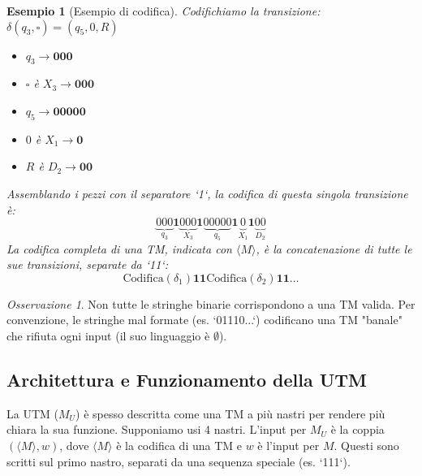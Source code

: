 \documentclass[a4paper]{article}
\newtheorem{example}{Esempio}
\newcommand{\blankS}{\ensuremath{\square}}
\theoremstyle{remark} %
\newtheorem{remark}{Osservazione}
\begin{document}
\begin{example}[Esempio di codifica]
Codifichiamo la transizione: $\delta(q_3, \blankS) = (q_5, 0, R)$
\begin{itemize}
    \item $q_3 \rightarrow \textbf{000}$
    \item $\blankS$ è $X_3 \rightarrow \textbf{000}$
    \item $q_5 \rightarrow \textbf{00000}$
    \item $0$ è $X_1 \rightarrow \textbf{0}$
    \item $R$ è $D_2 \rightarrow \textbf{00}$
\end{itemize}
Assemblando i pezzi con il separatore `1`, la codifica di questa singola transizione è:
\[ \underbrace{000}_{q_3} \mathbf{1} \underbrace{000}_{X_3} \mathbf{1} \underbrace{00000}_{q_5} \mathbf{1} \underbrace{0}_{X_1} \mathbf{1} \underbrace{00}_{D_2} \]
La codifica completa di una TM, indicata con $\langle M \rangle$, è la concatenazione di tutte le sue transizioni, separate da `11`:
\[ \text{Codifica}(\delta_1) \mathbf{11} \text{Codifica}(\delta_2) \mathbf{11} \dots \]
\end{example}

\begin{remark}
Non tutte le stringhe binarie corrispondono a una TM valida. Per convenzione, le stringhe mal formate (es. `01110...`) codificano una TM "banale" che rifiuta ogni input (il suo linguaggio è $\emptyset$).
\end{remark}

\subsection{Architettura e Funzionamento della UTM}

La UTM ($M_U$) è spesso descritta come una TM a più nastri per rendere più chiara la sua funzione. Supponiamo usi 4 nastri. L'input per $M_U$ è la coppia $(\langle M \rangle, w)$, dove $\langle M \rangle$ è la codifica di una TM e $w$ è l'input per $M$. Questi sono scritti sul primo nastro, separati da una sequenza speciale (es. `111`).
\end{document}

